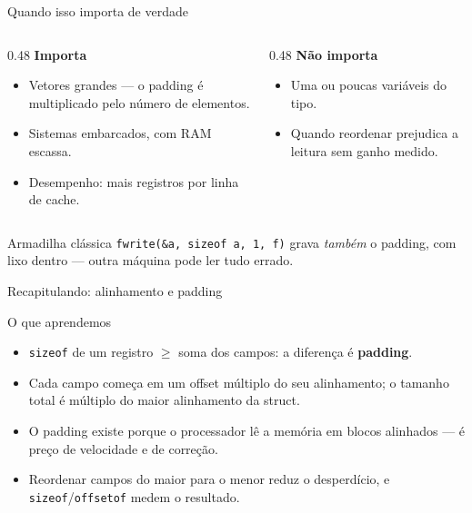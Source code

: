 \documentclass[aspectratio=169]{beamer}
\begin{document}
\begin{frame}{Quando isso importa de verdade}
  \begin{columns}[T]
    \begin{column}{0.48\textwidth}
      \textbf{Importa}
      \begin{itemize}
        \item Vetores grandes --- o padding é multiplicado pelo número de
          elementos.
        \item Sistemas embarcados, com RAM escassa.
        \item Desempenho: mais registros por linha de cache.
      \end{itemize}
    \end{column}
    \begin{column}{0.48\textwidth}
      \textbf{Não importa}
      \begin{itemize}
        \item Uma ou poucas variáveis do tipo.
        \item Quando reordenar prejudica a leitura sem ganho medido.
      \end{itemize}
    \end{column}
  \end{columns}
  \begin{alertblock}{Armadilha clássica}
    \texttt{fwrite(\&a, sizeof a, 1, f)} grava \emph{também} o padding, com
    lixo dentro --- outra máquina pode ler tudo errado.
  \end{alertblock}
\end{frame}

\begin{frame}{Recapitulando: alinhamento e padding}
  \begin{block}{O que aprendemos}
    \begin{itemize}
      \item \texttt{sizeof} de um registro $\geq$ soma dos campos: a diferença é
        \textbf{padding}.
      \item Cada campo começa em um offset múltiplo do seu alinhamento; o
        tamanho total é múltiplo do maior alinhamento da struct.
      \item O padding existe porque o processador lê a memória em blocos
        alinhados --- é preço de velocidade e de correção.
      \item Reordenar campos do maior para o menor reduz o desperdício, e
        \texttt{sizeof}/\texttt{offsetof} medem o resultado.
    \end{itemize}
  \end{block}
\end{frame}
\end{document}
